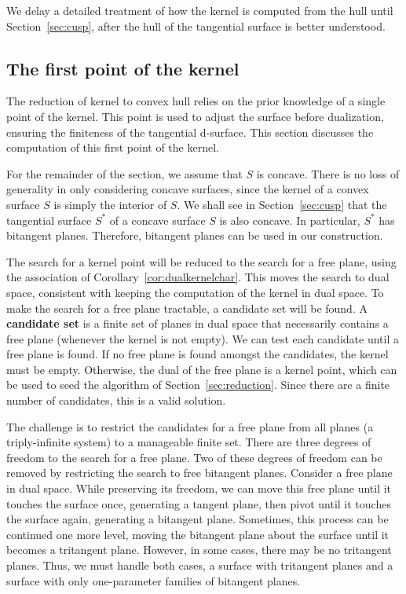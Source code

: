 \documentclass[doublespacing]{elsart}
\begin{document}
We delay a detailed treatment of how the kernel is computed from the hull
until Section~\ref{sec:cusp}, after the hull of the tangential surface is better understood.


\subsection{The first point of the kernel}
\label{sec:firstpt}

The reduction of kernel to convex hull relies on the prior knowledge
of a single point of the kernel.
This point is used to adjust the surface before dualization, ensuring
the finiteness of the tangential d-surface.
This section discusses the computation of this first point of the kernel.

For the remainder of the section, we assume that $S$ is concave.
There is no loss of generality in only considering concave surfaces,
since the kernel of a convex surface $S$ is simply the interior of $S$.
We shall see in Section~\ref{sec:cusp} that the tangential surface $S^*$ of
a concave surface $S$ is also concave.
In particular, $S^*$ has bitangent planes.
Therefore, bitangent planes can be used in our construction. %

The search for a kernel point will be reduced to the search for a free plane,
using the association of Corollary~\ref{cor:dualkernelchar}.
This moves the search to dual space, consistent with keeping the computation
of the kernel in dual space.
To make the search for a free plane tractable, a candidate set will be found.
A {\bf candidate set} is a finite set of planes in dual space
that necessarily contains a free plane (whenever the kernel is not empty).
We can test each candidate until a free plane is found.
If no free plane is found amongst the candidates,
the kernel must be empty.
Otherwise, the dual of the free plane is a kernel point,
which can be used to seed the algorithm of Section~\ref{sec:reduction}.
Since there are a finite number of candidates, this is a valid solution.

The challenge is to restrict the candidates for a free plane from
all planes (a triply-infinite system) to a manageable finite set.
There are three degrees of freedom to the search for a free plane.
Two of these degrees of freedom can be removed by restricting the search
to free bitangent planes.
Consider a free plane in dual space.
While preserving its freedom, we can move this free plane
until it touches the surface once, generating a tangent plane,
then pivot until it touches the surface again, generating a bitangent plane.
Sometimes, this process can be continued one more level,
moving the bitangent plane about the surface until it becomes a
tritangent plane.
However, in some cases, there may be no tritangent planes.
Thus, we must handle both cases, a surface with tritangent planes
and a surface with only one-parameter families of bitangent planes.
\end{document}
